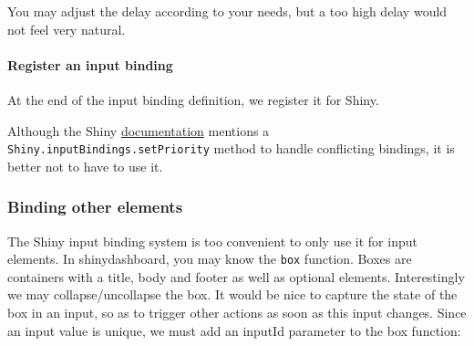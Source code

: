\documentclass[]{book}
\newenvironment{Shaded}{\begin{snugshade}}{\end{snugshade}}
\newcommand{\AttributeTok}[1]{\textcolor[rgb]{0.77,0.63,0.00}{#1}}
\newcommand{\CommentTok}[1]{\textcolor[rgb]{0.56,0.35,0.01}{\textit{#1}}}
\newcommand{\KeywordTok}[1]{\textcolor[rgb]{0.13,0.29,0.53}{\textbf{#1}}}
\newcommand{\NormalTok}[1]{#1}
\newcommand{\OperatorTok}[1]{\textcolor[rgb]{0.81,0.36,0.00}{\textbf{#1}}}
\newcommand{\StringTok}[1]{\textcolor[rgb]{0.31,0.60,0.02}{#1}}
\newcommand{\VariableTok}[1]{\textcolor[rgb]{0.00,0.00,0.00}{#1}}
\let\oldparagraph\paragraph
\renewcommand{\paragraph}[1]{\oldparagraph{#1}\mbox{}}
\begin{document}
You may adjust the delay according to your needs, but a too high delay would not feel very natural.

\hypertarget{register-an-input-binding}{%
\paragraph{Register an input binding}\label{register-an-input-binding}}

At the end of the input binding definition, we register it for Shiny.

\begin{Shaded}
\end{Shaded}

Although the Shiny \href{https://shiny.rstudio.com/articles/building-inputs.html}{documentation} mentions a \texttt{Shiny.inputBindings.setPriority} method to handle conflicting bindings, it is better not to have to use it.

\hypertarget{binding-other-elements}{%
\subsubsection{Binding other elements}\label{binding-other-elements}}

The Shiny input binding system is too convenient to only use it for input elements. In shinydashboard, you may know the \texttt{box} function. Boxes are containers with a title, body and footer as well as optional elements. Interestingly we may collapse/uncollapse the box. It would be nice to capture the state of the box in an input, so as to trigger other actions as soon as this input changes. Since an input value is unique, we must add an inputId parameter to the box function:
\end{document}
